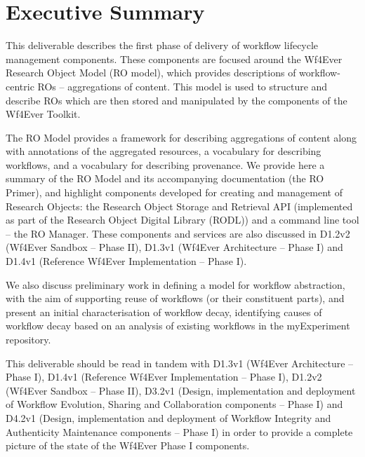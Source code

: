 \documentclass[a4paper, twoside, 11pt]{article}
\begin{document}
\section*{Executive Summary}
This deliverable describes the first phase of delivery of workflow
lifecycle management components. These components are focused around
the Wf4Ever Research Object Model (RO model), which provides
descriptions of workflow-centric ROs -- aggregations of content. This
model is used to structure and describe ROs which are then stored and
manipulated by the components of the Wf4Ever Toolkit.

The RO Model provides a framework for describing aggregations of
content along with annotations of the aggregated resources, a
vocabulary for describing workflows, and a vocabulary for describing
provenance. We provide here a summary of the RO Model and its
accompanying documentation (the RO Primer), and highlight components
developed for creating and management of Research Objects: the
Research Object Storage and Retrieval API (implemented as part of the
Research Object Digital Library (RODL)) and a command line tool -- the
RO Manager. These components and services are also discussed in D1.2v2
(Wf4Ever Sandbox -- Phase II), D1.3v1 (Wf4Ever Architecture -- Phase
I) and D1.4v1 (Reference Wf4Ever Implementation -- Phase I).

We also discuss preliminary work in defining a model for workflow
abstraction, with the aim of supporting reuse of workflows (or their
constituent parts), and present an initial characterisation of
workflow decay, identifying causes of workflow decay based on an
analysis of existing workflows in the myExperiment repository.

This deliverable should be read in tandem with D1.3v1 (Wf4Ever
Architecture -- Phase I), D1.4v1 (Reference Wf4Ever Implementation --
Phase I), D1.2v2 (Wf4Ever Sandbox -- Phase II), D3.2v1 (Design,
implementation and deployment of Workflow Evolution, Sharing and
Collaboration components -- Phase I) and D4.2v1 (Design,
implementation and deployment of Workflow Integrity and Authenticity
Maintenance components -- Phase I) in order to provide a complete
picture of the state of the Wf4Ever Phase I components.

\clearpage

\tableofcontents
\clearpage
\listoftables %
\listoffigures %

\clearpage
\sloppy
\end{document}
